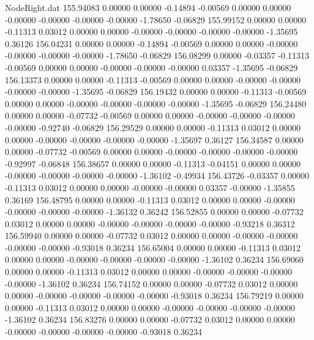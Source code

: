 \begin{filecontents}{NodeRight.dat}
 155.94083    0.00000    0.00000    -0.14894   -0.00569    0.00000    0.00000   -0.00000   -0.00000   -0.00000   -0.00000   -1.78650   -0.06829
 155.99152    0.00000    0.00000    -0.11313    0.03012    0.00000    0.00000   -0.00000   -0.00000   -0.00000   -0.00000   -1.35695    0.36126
 156.04231    0.00000    0.00000    -0.14894   -0.00569    0.00000    0.00000   -0.00000   -0.00000   -0.00000   -0.00000   -1.78650   -0.06829
 156.08299    0.00000   -0.03357    -0.11313   -0.00569    0.00000    0.00000   -0.00000   -0.00000   -0.00000    0.03357   -1.35695   -0.06829
 156.13373    0.00000    0.00000    -0.11313   -0.00569    0.00000    0.00000   -0.00000   -0.00000   -0.00000   -0.00000   -1.35695   -0.06829
 156.19432    0.00000    0.00000    -0.11313   -0.00569    0.00000    0.00000   -0.00000   -0.00000   -0.00000   -0.00000   -1.35695   -0.06829
 156.24480    0.00000    0.00000    -0.07732   -0.00569    0.00000    0.00000   -0.00000   -0.00000   -0.00000   -0.00000   -0.92740   -0.06829
 156.29529    0.00000    0.00000    -0.11313    0.03012    0.00000    0.00000   -0.00000   -0.00000   -0.00000   -0.00000   -1.35697    0.36127
 156.34587    0.00000    0.00000    -0.07732   -0.00569    0.00000    0.00000   -0.00000   -0.00000   -0.00000   -0.00000   -0.92997   -0.06848
 156.38657    0.00000    0.00000    -0.11313   -0.04151    0.00000    0.00000   -0.00000   -0.00000   -0.00000   -0.00000   -1.36102   -0.49934
 156.43726   -0.03357    0.00000    -0.11313    0.03012    0.00000    0.00000   -0.00000   -0.00000    0.03357   -0.00000   -1.35855    0.36169
 156.48795    0.00000    0.00000    -0.11313    0.03012    0.00000    0.00000   -0.00000   -0.00000   -0.00000   -0.00000   -1.36132    0.36242
 156.52855    0.00000    0.00000    -0.07732    0.03012    0.00000    0.00000   -0.00000   -0.00000   -0.00000   -0.00000   -0.93218    0.36312
 156.59940    0.00000    0.00000    -0.07732    0.03012    0.00000    0.00000   -0.00000   -0.00000   -0.00000   -0.00000   -0.93018    0.36234
 156.65004    0.00000    0.00000    -0.11313    0.03012    0.00000    0.00000   -0.00000   -0.00000   -0.00000   -0.00000   -1.36102    0.36234
 156.69060    0.00000    0.00000    -0.11313    0.03012    0.00000    0.00000   -0.00000   -0.00000   -0.00000   -0.00000   -1.36102    0.36234
 156.74152    0.00000    0.00000    -0.07732    0.03012    0.00000    0.00000   -0.00000   -0.00000   -0.00000   -0.00000   -0.93018    0.36234
 156.79219    0.00000    0.00000    -0.11313    0.03012    0.00000    0.00000   -0.00000   -0.00000   -0.00000   -0.00000   -1.36102    0.36234
 156.83276    0.00000    0.00000    -0.07732    0.03012    0.00000    0.00000   -0.00000   -0.00000   -0.00000   -0.00000   -0.93018    0.36234

\end{filecontents}
